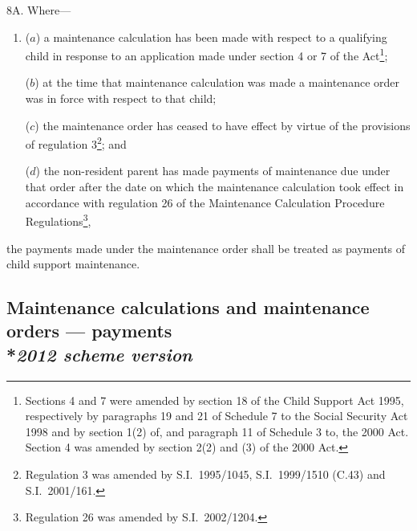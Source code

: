 \documentclass[12pt,a4paper]{article}
\begin{document}
8A.  Where—
\begin{enumerate}\item[]
($a$) a maintenance calculation has been made with respect to a qualifying child in response to an application made under section 4 or 7 of the Act\footnote{Sections 4 and 7 were amended by section 18 of the Child Support Act 1995, respectively by paragraphs 19 and 21 of Schedule 7 to the Social Security Act 1998 and by section 1(2) of, and paragraph 11 of Schedule 3 to, the 2000 Act. Section 4 was amended by section 2(2) and (3) of the 2000 Act.};

($b$) at the time that maintenance calculation was made a maintenance order was in force with respect to that child;

($c$) the maintenance order has ceased to have effect by virtue of the provisions of regulation 3\footnote{Regulation 3 was amended by S.I.\ 1995/1045, S.I.\ 1999/1510 (C.43) and S.I.\ 2001/161.}; and

($d$) the non-resident parent has made payments of maintenance due under that order after the date on which the maintenance calculation took effect in accordance with regulation 26 of the Maintenance Calculation Procedure Regulations\footnote{Regulation 26 was amended by S.I.\ 2002/1204.},
\end{enumerate}
the payments made under the maintenance order shall be treated as payments of child support maintenance.


\subsection[8A. Maintenance calculations and maintenance orders --- payments --- \emph{2012 scheme version}]{\sloppy Maintenance calculations and maintenance orders --- payments\\*\emph{2012 scheme version}}
\end{document}
